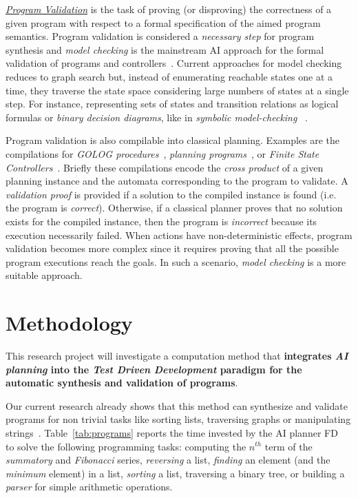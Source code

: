 \documentclass[10pt,a4paper]{paper}
\begin{document}
{\underline{\em Program Validation}} is the task of proving (or disproving) the correctness of a given program with respect to a formal specification of the aimed program semantics. Program validation is considered a {\em necessary step} for program synthesis and {\em model checking} is the mainstream AI approach for the formal validation of programs and controllers~\cite{clarke1999model}. Current approaches for model checking reduces to graph search but, instead of enumerating reachable states one at a time, they traverse the state space considering large numbers of states at a single step. For instance, representing sets of states and transition relations as logical formulas or {\em binary decision diagrams}, like in {\em symbolic model-checking} ~\cite{mcmillan1993symbolic}.

Program validation is also compilable into classical planning. Examples are the compilations for {\em {\sc GOLOG} procedures}~\cite{baier2007exploiting}, {\em planning programs}~\cite{segovia:programs:AIJ19}, or {\em Finite State Controllers}~\cite{Geffner:FSM:AAAI10,sergio:aprograming:ijcai16,segovia:FSC:JAIR2018}. Briefly these compilations encode the {\em cross product} of a given planning instance and the automata corresponding to the program to validate. A {\em validation proof} is provided if a solution to the compiled instance is found (i.e. the program is {\em correct}). Otherwise, if a classical planner proves that no solution exists for the compiled instance, then the program is {\em incorrect} because its execution necessarily failed. When actions have non-deterministic effects, program validation becomes more complex since it requires proving that all the possible program executions reach the goals. In such a scenario, {\em model checking} is a more suitable approach.
\newpage



\section{Methodology}
\label{sec:methodology}
This research project will investigate a computation method that {\bf integrates {\em AI planning} into the {\em Test Driven Development} paradigm for the automatic synthesis and validation of programs}. 

Our current research already shows that this method can synthesize and validate programs for non trivial tasks like sorting lists, traversing graphs or manipulating strings~\cite{jimenez2015computing,sergio:aprograming:icaps16,sergio:aprogramingb:ijcai16,sergio:aprograming:ijcai16,segovia2017generating,segovia:FSC:JAIR2018,segovia:programs:AIJ19}. Table~\ref{tab:programs} reports the time invested by the AI planner {\sc FD}~\cite{helmert2006fast} to solve the following programming tasks: computing the $n^{th}$ term of the {\em summatory} and  {\em Fibonacci} series, {\em reversing} a list, {\em finding} an element (and the {\em minimum} element) in a list, {\em sorting} a list, traversing a binary tree, or building a {\em parser} for simple arithmetic operations. 
 
\end{document}
